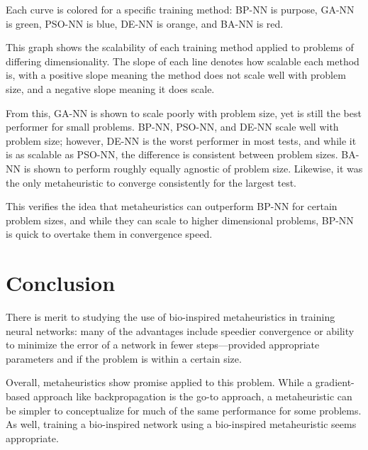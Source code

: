 \documentclass[a4paper,12pt]{article}
\begin{document}
Each curve is colored for a specific training method: BP-NN is purpose, GA-NN is green, PSO-NN is blue, DE-NN is orange, and BA-NN is red.

\pagebreak

This graph shows the scalability of each training method applied to problems of differing dimensionality. The slope of each line denotes how scalable each method is, with a positive slope meaning the method does not scale well with problem size, and a negative slope meaning it does scale.

From this, GA-NN is shown to scale poorly with problem size, yet is still the best performer for small problems. BP-NN, PSO-NN, and DE-NN scale well with problem size; however, DE-NN is the worst performer in most tests, and while it is as scalable as PSO-NN, the difference is consistent between problem sizes. BA-NN is shown to perform roughly equally agnostic of problem size. Likewise, it was the only metaheuristic to converge consistently for the largest test.

This verifies the idea that metaheuristics can outperform BP-NN for certain problem sizes, and while they can scale to higher dimensional problems, BP-NN is quick to overtake them in convergence speed.

\section{Conclusion}

There is merit to studying the use of bio-inspired metaheuristics in training neural networks: many of the advantages include speedier convergence or ability to minimize the error of a network in fewer steps---provided appropriate parameters and if the problem is within a certain size.

Overall, metaheuristics show promise applied to this problem. While a gradient-based approach like backpropagation is the go-to approach, a metaheuristic can be simpler to conceptualize for much of the same performance for some problems. As well, training a bio-inspired network using a bio-inspired metaheuristic seems appropriate.



\end{document}
